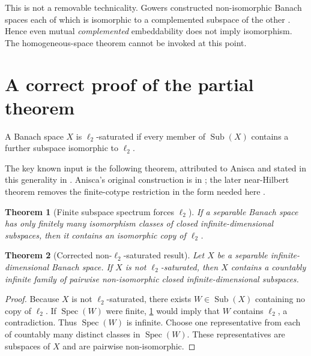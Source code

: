 \documentclass[11pt]{article}
\newtheorem{theorem}{Theorem}[section]
\theoremstyle{definition}
\theoremstyle{remark}
\newcommand{\ellTwo}{\ell_2}
\newcommand{\Sub}{\operatorname{Sub}}
\newcommand{\Spec}{\operatorname{Spec}}
\begin{document}
This is not a removable technicality.  Gowers constructed non-isomorphic Banach spaces each of which is isomorphic to a complemented subspace of the other \cite{GowersSB}.  Hence even mutual \emph{complemented} embeddability does not imply isomorphism.  The homogeneous-space theorem cannot be invoked at this point.

\begin{center}
\end{center}

\section{A correct proof of the partial theorem}

A Banach space \(X\) is \(\ellTwo\)-saturated if every member of \(\Sub(X)\) contains a further subspace isomorphic to \(\ellTwo\).

The key known input is the following theorem, attributed to Anisca and stated in this generality in \cite[Theorem 6.6]{CCRF2023}.  Anisca's original construction is in \cite{Anisca2007}; the later near-Hilbert theorem removes the finite-cotype restriction in the form needed here \cite{Cuellar2018}.

\begin{theorem}[Finite subspace spectrum forces \(\ellTwo\)]\label{thm:anisca}
If a separable Banach space has only finitely many isomorphism classes of closed infinite-dimensional subspaces, then it contains an isomorphic copy of \(\ellTwo\).
\end{theorem}

\begin{theorem}[Corrected non-\(\ellTwo\)-saturated result]\label{thm:corrected}
Let \(X\) be a separable infinite-dimensional Banach space.  If \(X\) is not \(\ellTwo\)-saturated, then \(X\) contains a countably infinite family of pairwise non-isomorphic closed infinite-dimensional subspaces.
\end{theorem}

\begin{proof}
Because \(X\) is not \(\ellTwo\)-saturated, there exists \(W\in\Sub(X)\) containing no copy of \(\ellTwo\).  If \(\Spec(W)\) were finite, \cref{thm:anisca} would imply that \(W\) contains \(\ellTwo\), a contradiction.  Thus \(\Spec(W)\) is infinite.  Choose one representative from each of countably many distinct classes in \(\Spec(W)\).  These representatives are subspaces of \(X\) and are pairwise non-isomorphic.
\end{proof}
\end{document}
